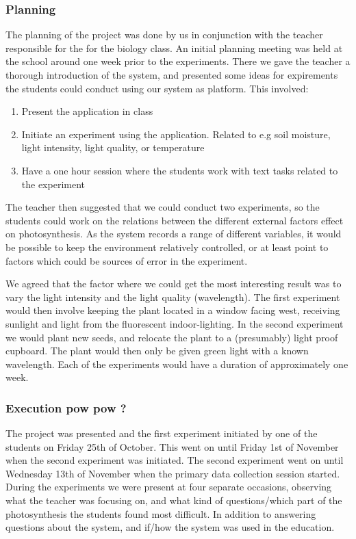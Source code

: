 \subsubsection{Planning}
The planning of the project was done by us in conjunction with the teacher responsible for the for the biology class. An initial planning meeting was held at the school around one week prior to the experiments. There we gave the teacher a thorough introduction of the system, and presented some ideas for expirements the students could conduct using our system as platform. This involved:

\begin{enumerate}
\item{Present the application in class}
\item{Initiate an experiment using the application. Related to e.g soil moisture, light intensity, light quality, or temperature}
\item{Have a one hour session where the students work with text tasks related to the experiment}
\end{enumerate}

The teacher then suggested that we could conduct two experiments, so the students could work on the relations between the different external factors effect on photosynthesis. As the system records a range of different variables, it would be possible to keep the environment relatively controlled, or at least point to factors which could be sources of error in the experiment. 

We agreed that the factor where we could get the most interesting result was to vary the light intensity and the light quality (wavelength). The first experiment would then involve keeping the plant located in a window facing west, receiving sunlight and light from the fluorescent indoor-lighting. In the second experiment we would plant new seeds, and relocate the plant to a (presumably) light proof cupboard. The plant would then only be given green light with a known wavelength. Each of the experiments would have a duration of approximately one week. 

\subsubsection{Execution pow pow ?}
The project was presented and the first experiment initiated by one of the students on Friday 25th of October. This went on until Friday 1st of November when the second experiment was initiated. The second experiment went on until Wednesday 13th of November when the primary data collection session started. During the experiments we were present at four separate occasions, observing what the teacher was focusing on, and what kind of questions/which part of the photosynthesis the students found most difficult. In addition to answering questions about the system, and if/how the system was used in the education. 




